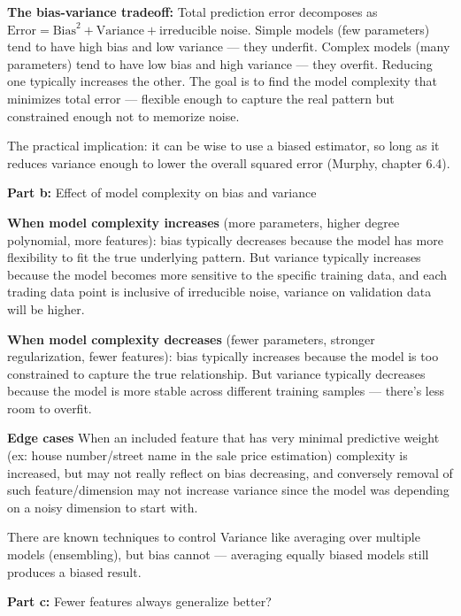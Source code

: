 \documentclass{article}
\begin{document}
\medskip
\textbf{The bias-variance tradeoff:} Total prediction error decomposes as $\text{Error} = \text{Bias}^2 + \text{Variance} + \text{irreducible noise}$. Simple models (few parameters) tend to have high bias and low variance --- they underfit. Complex models (many parameters) tend to have low bias and high variance --- they overfit. Reducing one typically increases the other. The goal is to find the model complexity that minimizes total error --- flexible enough to capture the real pattern but constrained enough not to memorize noise.

The practical implication: it can be wise to use a biased estimator, so long as it reduces variance enough to lower the overall squared error (Murphy, chapter 6.4).

\bigskip
\begin{mdframed}
\textbf{\large Part b:} Effect of model complexity on bias and variance
\end{mdframed}

\textbf{When model complexity increases} (more parameters, higher degree polynomial, more features): bias typically decreases because the model has more flexibility to fit the true underlying pattern. But variance typically increases because the model becomes more sensitive to the specific training data, and each trading data point is inclusive of irreducible noise, variance on validation data will be higher.

\textbf{When model complexity decreases} (fewer parameters, stronger regularization, fewer features): bias typically increases because the model is too constrained to capture the true relationship. But variance typically decreases because the model is more stable across different training samples --- there's less room to overfit.

\textbf{Edge cases} When an included feature that has very minimal predictive weight (ex: house number/street name in the sale price estimation) complexity is increased, but may not really reflect on bias decreasing, and conversely removal of such feature/dimension may not increase variance since the model was depending on a noisy dimension to start with.

There are known techniques to control Variance like averaging over multiple models (ensembling), but bias cannot --- averaging equally biased models still produces a biased result.

\bigskip
\begin{mdframed}
\textbf{\large Part c:} Fewer features always generalize better?
\end{mdframed}
\end{document}

